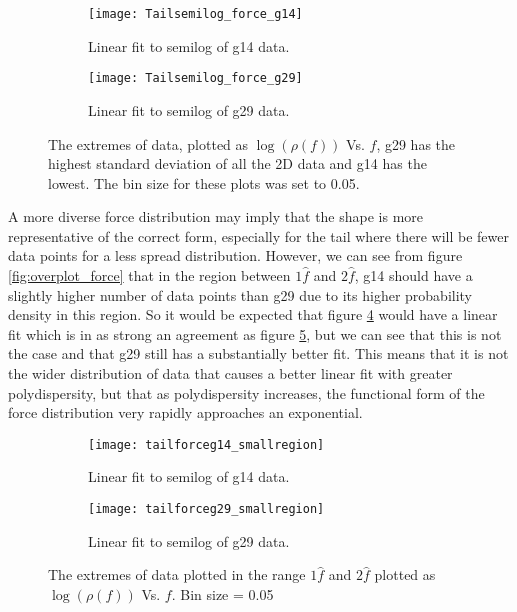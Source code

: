 \documentclass[12pt] {article} %
\begin{document}
		
		\begin{figure}[H]
				\centering
				\begin{subfigure}[h]{0.49\textwidth}
					\centering
					\texttt{[image: Tailsemilog\_force\_g14]}
					\caption{Linear fit to semilog of g14 data.}
					\label{fig:Tailsemilog_force_g14}
				\end{subfigure}
				\hfill
				\begin{subfigure}[h]{0.49\textwidth}
					\centering
					\texttt{[image: Tailsemilog\_force\_g29]}
					\caption{Linear fit to semilog of g29 data.}
					\label{fig:Tailsemilog_force_g29}
				\end{subfigure}
				\caption{The extremes of data, plotted as $\log(\rho(f))$ Vs. $f$, g29 has the highest standard deviation of all the 2D data and g14 has the lowest. The bin size for these plots was set to 0.05.}
				\label{fig:data_extremes}
		\end{figure}
		
				
				A more diverse force distribution may imply that the shape is more representative of the correct form, especially for the tail where there will be fewer data points for a less spread distribution. However, we can see from figure \ref{fig:overplot_force} that in the region between $1\hat{f}$ and $2\hat{f}$, g14 should have a slightly higher number of data points than g29 due to its higher probability density in this region. So it would be expected that figure \ref{fig:tailforceg14_smallregion} would have a linear fit which is in as strong an agreement as figure \ref{fig:tailforceg29_smallregion}, but we can see that this is not the case and that g29 still has a substantially better fit. This means that it is not the wider distribution of data that causes a better linear fit with greater polydispersity, but that as polydispersity increases, the functional form of the force distribution very rapidly approaches an exponential. \\

		
		
		\begin{figure}[H]
				\centering
			\begin{subfigure}[h]{0.49\textwidth}
				\centering
				\texttt{[image: tailforceg14\_smallregion]}
				\caption{Linear fit to semilog of g14 data.}
				\label{fig:tailforceg14_smallregion}
			\end{subfigure}
			\hfill
			\begin{subfigure}[h]{0.49\textwidth}
				\centering
				\texttt{[image: tailforceg29\_smallregion]}
				\caption{Linear fit to semilog of g29 data.}
				\label{fig:tailforceg29_smallregion}
			\end{subfigure} 
		\caption{The extremes of data plotted in the range $1\hat{f}$ and $2\hat{f}$ plotted as $\log(\rho(f))$ Vs. $f$. Bin size = 0.05}
		\label{fig:data_smallreagionsoftail}
		\end{figure}
		
\end{document}
